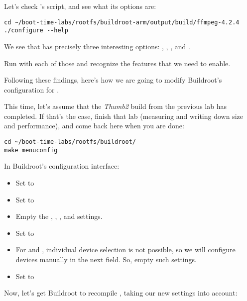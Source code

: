 Let's check 's  script, and see what its
options are:

\begin{verbatim}
cd ~/boot-time-labs/rootfs/buildroot-arm/output/build/ffmpeg-4.2.4
./configure --help
\end{verbatim}

We see that  has precisely three interesting options:
, , ,
 and .

Run  with each of those and recognize the features that
we need to enable.

Following these findings, here's how we are going to modify Buildroot's
configuration for .

This time, let's assume that the {\em Thumb2} build from the previous
lab has completed. If that's the case, finish that lab (measuring and
writing down size and performance), and come back here when you are done:

\begin{verbatim}
cd ~/boot-time-labs/rootfs/buildroot/
make menuconfig
\end{verbatim}

In Buildroot's configuration interface:

\begin{itemize}
\item Set  to 
\item Set  to 
\item Empty the , ,
      ,  and  settings.
\item Set  to 
\item For  and ,
      individual device selection is not possible, so we will configure
      devices manually in the next field. So, empty such settings.
\item Set  to\\
\end{itemize}

Now, let's get Buildroot to recompile , taking our new
settings into account:

